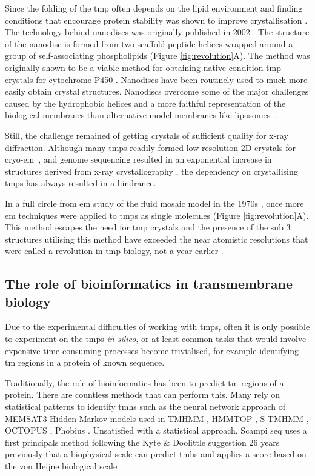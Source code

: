 Since the folding of the \gls{tmp} often depends on the lipid environment and finding conditions that encourage protein stability was shown to improve crystallisation \cite{Carpenter2008, Rosenbusch2001}.
The technology behind nanodiscs was originally published in 2002 \cite{Bayburt2002}.
The structure of the nanodisc is formed from two scaffold peptide helices wrapped around a group of self\--associating phospholipids (Figure \ref{fig:revolution}A).
The method was originally shown to be a viable method for obtaining native condition \gls{tmp} crystals for cytochrome P450 \cite{Duan2004}.
Nanodiscs have been routinely used to much more easily obtain crystal structures.
Nanodiscs overcome some of the major challenges caused by the hydrophobic helices and a more faithful representation of the biological membranes than alternative model membranes like liposomes~\cite{Borch2009}.

Still, the challenge remained of getting crystals of sufficient quality for x\--ray diffraction.
Although many \gls{tmp}s readily formed low\--resolution 2D crystals for cryo\--\gls{em}~\cite{Vinothkumar2015, Raunser2009}, and genome sequencing resulted in an exponential increase in structures derived from x\--ray crystallography \cite{Vinothkumar2010}, the dependency on crystallising \gls{tmp}s has always resulted in a hindrance.

In a full circle from \gls{em} study of the fluid mosaic model in the 1970s \cite{Singer1972}, once more \gls{em} techniques were applied to \gls{tmp}s as single molecules (Figure \ref{fig:revolution}A).
This method escapes the need for \gls{tmp} crystals \cite{Vinothkumar2015} and the presence of the sub 3\angstrom~ structures \cite{Grant2015, Bartesaghi2015} utilising this method have exceeded the near atomistic resolutions that were called a revolution in \gls{tmp} biology, not a year earlier \cite{Kuhlbrandt2014}.


\subsection{The role of bioinformatics in transmembrane biology}

Due to the experimental difficulties of working with \gls{tmp}s, often it is only possible to experiment on the \gls{tmp}s \textit{in silico}, or at least common tasks that would involve expensive time\--consuming processes become trivialised, for example identifying \gls{tm} regions in a protein of known sequence.

Traditionally, the role of bioinformatics has been to predict \gls{tm} regions of a protein.
There are countless methods that can perform this.
Many rely on statistical patterns to identify \gls{tmh}s such as the neural network approach of MEMSAT3 \cite{Jones2007} Hidden Markov models used in TMHMM \cite{Krogh2001}, HMMTOP \cite{Tusnady2001}, S\--TMHMM \cite{Viklund2004}, OCTOPUS \cite{Viklund2008}, Phobius \cite{Kall2004}.
Unsatisfied with a statistical approach, Scampi seq \cite{Bernsel2008} uses a first principals method following the Kyte \& Doolittle suggestion 26 years previously that a biophysical scale can predict \gls{tmh}s \cite{Kyte1982} and applies a score based on the von Heijne biological scale \cite{Hessa2007}.

